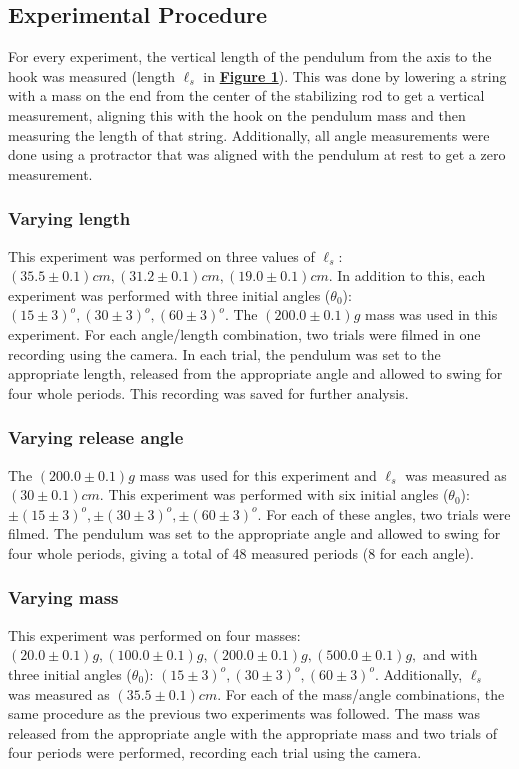 \documentclass[
	letterpaper
	12pt
]{template}
\newcommand{\bref}[2]{\textbf{\hyperref[#1]{#2}}}
\begin{document}
\subsection{Experimental Procedure}
For every experiment, the vertical length of the pendulum from the axis to the hook was measured (length $\ell_s$ in \bref{front}{Figure 1}). This was done by lowering a string with a mass on the end from the center of the stabilizing rod to get a vertical measurement, aligning this with the hook on the pendulum mass and then measuring the length of that string. Additionally, all angle measurements were done using a protractor that was aligned with the pendulum at rest to get a zero measurement.
\subsubsection{Varying length}
This experiment was performed on three values of $\ell_s$: $(35.5\pm0.1)\unit{cm}, (31.2\pm0.1)\unit{cm},(19.0\pm0.1)\unit{cm}$. In addition to this, each experiment was performed with three initial angles ($\theta_0$): $(15\pm3)^o, (30\pm3)^o,(60\pm3)^o$. The $(200.0\pm 0.1)\unit{g}$ mass was used in this experiment. For each angle/length combination, two trials were filmed in one recording using the camera. In each trial, the pendulum was set to the appropriate length, released from the appropriate angle and allowed to swing for four whole periods. This recording was saved for further analysis.
\subsubsection{Varying release angle}
The $(200.0\pm 0.1)\unit{g}$ mass was used for this experiment and $\ell_s$ was measured as $(30\pm 0.1)\unit{cm}$. This experiment was performed with six initial angles ($\theta_0$): $\pm(15\pm3)^o, \pm(30\pm3)^o,\pm(60\pm3)^o$. For each of these angles, two trials were filmed. The pendulum was set to the appropriate angle and allowed to swing for four whole periods, giving a total of 48 measured periods (8 for each angle).
\subsubsection{Varying mass}
This experiment was performed on four masses: $(20.0\pm0.1)\unit{g},(100.0\pm0.1)\unit{g},(200.0\pm0.1)\unit{g},(500.0\pm0.1)\unit{g},$ and with three initial angles ($\theta_0$): $(15\pm3)^o, (30\pm3)^o,(60\pm3)^o$. Additionally, $\ell_s$ was measured as $(35.5\pm0.1)\unit{cm}$. For each of the mass/angle combinations, the same procedure as the previous two experiments was followed. The mass was released from the appropriate angle with the appropriate mass and two trials of four periods were performed, recording each trial using the camera.
\end{document}
